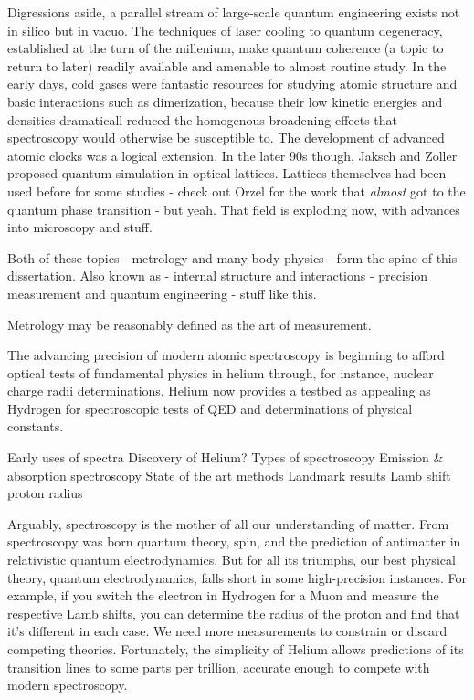Digressions aside, a parallel stream of large-scale quantum engineering
exists not in silico but in vacuo.
	The techniques of laser cooling to
quantum degeneracy, established at the turn of the millenium, make
quantum coherence (a topic to return to later) readily available and
amenable to almost routine study.
	In the early days, cold gases were
fantastic resources for studying atomic structure and basic interactions
such as dimerization, because their low kinetic energies and densities
dramaticall reduced the homogenous broadening effects that spectroscopy
would otherwise be susceptible to.
	The development of advanced atomic
clocks was a logical extension.
	In the later 90s though, Jaksch and
Zoller proposed quantum simulation in optical lattices.
	Lattices
themselves had been used before for some studies - check out Orzel for
the work that \emph{almost} got to the quantum phase transition - but
yeah.
	That field is exploding now, with advances into microscopy and
stuff.

Both of these topics - metrology and many body physics - form the spine
of this dissertation.
	Also known as - internal structure and
interactions - precision measurement and quantum engineering - stuff
like this.



Metrology may be reasonably defined as the art of measurement.

The advancing precision of modern atomic spectroscopy is beginning to afford optical tests of fundamental physics in helium through, for instance, nuclear charge radii determinations.
	Helium now provides a testbed as appealing as Hydrogen for spectroscopic tests of QED and determinations of physical constants.
	

Early uses of spectra Discovery of Helium? Types of spectroscopy
Emission \& absorption spectroscopy State of the art methods Landmark
results Lamb shift proton radius

Arguably, spectroscopy is the mother of all our understanding of matter.
	From spectroscopy was born quantum theory, spin, and the prediction of antimatter in relativistic quantum electrodynamics.
	But for all its triumphs, our best physical theory, quantum electrodynamics, falls short in some high-precision instances.
	For example, if you switch the electron in Hydrogen for a Muon and measure the respective Lamb shifts, you can determine the radius of the proton and find that it's different in each case.
	We need more measurements to constrain or discard competing theories.
	Fortunately, the simplicity of Helium allows predictions of its transition lines to some parts per trillion, accurate enough to compete with modern spectroscopy.

